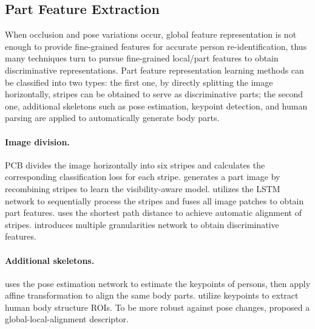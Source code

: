 \documentclass[10pt,twocolumn,letterpaper]{article}
\begin{document}
\subsection{Part Feature Extraction}
\label{sec:part-level}
When occlusion and pose variations occur, global feature representation is not enough to provide fine-grained features for accurate person re-identification, thus many techniques turn to pursue fine-grained local/part features to obtain discriminative representations. Part feature representation learning methods can be classified into two types: the first one, by directly splitting the image horizontally, stripes can be obtained to serve as discriminative parts; the second one, additional skeletons such as pose estimation, keypoint detection, and human parsing are applied to automatically generate body parts. 

\vspace{-0.4cm}
\paragraph{Image division.}
PCB\cite{sun2018beyond} divides the image horizontally into six stripes and calculates the corresponding classification loss for each stripe. \cite{sun2019perceive} generates a part image by recombining stripes to learn the visibility-aware model. \cite{varior2016siamese} utilizes the LSTM network to sequentially process the stripes and fuses all image patches to obtain part features. \cite{zhang2017alignedreid} uses the shortest path distance to achieve automatic alignment of stripes. \cite{wang2018learning} introduces multiple granularities network to obtain discriminative features.

\vspace{-0.4cm}
\paragraph{Additional skeletons.}
\cite{zheng2019pose} uses the pose estimation network to estimate the keypoints of persons, then apply affine transformation to align the same body parts. \cite{zhao2017spindle} utilize keypoints to extract human body structure ROIs. To be more robust against pose changes, \cite{wei2017glad} proposed a global-local-alignment descriptor.
\end{document}
